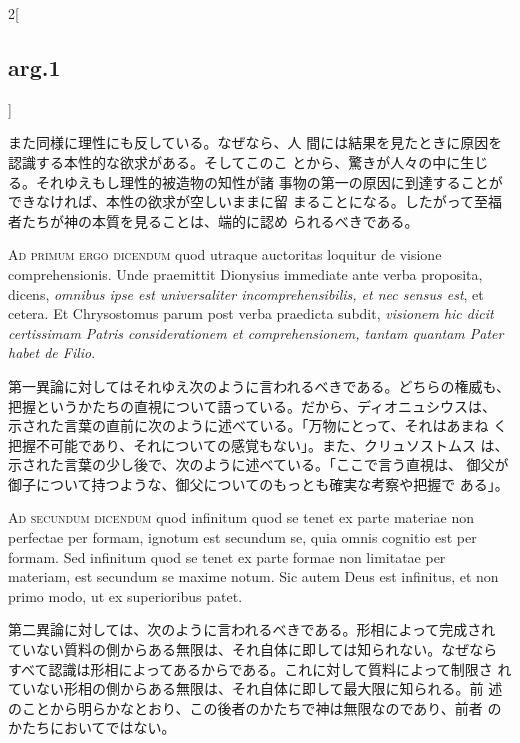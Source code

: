 \documentclass[paper=a4paper,fontsize=10pt,jafontsize=9pt,titlepage]{jlreq}
\begin{document}
\begin{paracol}{2}[\subsection{arg.1}]
\switchcolumn

また同様に理性にも反している。なぜなら、人
間には結果を見たときに原因を認識する本性的な欲求がある。そしてこのこ
とから、驚きが人々の中に生じる。それゆえもし理性的被造物の知性が諸
事物の第一の原因に到達することができなければ、本性の欲求が空しいままに留
まることになる。したがって至福者たちが神の本質を見ることは、端的に認め
られるべきである。

\switchcolumn*[\subsection{ad.1}]

{\scshape  Ad primum ergo dicendum} quod utraque auctoritas loquitur de
 visione comprehensionis. Unde praemittit Dionysius immediate ante verba
 proposita, dicens, {\itshape omnibus ipse est universaliter incomprehensibilis,
 et nec sensus est}, et cetera. Et Chrysostomus parum post verba
 praedicta subdit, {\itshape visionem hic dicit certissimam Patris considerationem
 et comprehensionem, tantam quantam Pater habet de Filio}.

\switchcolumn

第一異論に対してはそれゆえ次のように言われるべきである。どちらの権威も、
把握というかたちの直視について語っている。だから、ディオニュシウスは、
示された言葉の直前に次のように述べている。「万物にとって、それはあまね
く把握不可能であり、それについての感覚もない」。また、クリュソストムス
は、示された言葉の少し後で、次のように述べている。「ここで言う直視は、
御父が御子について持つような、御父についてのもっとも確実な考察や把握で
ある」。

\switchcolumn*[\subsection{ad.2}]

{\scshape  Ad secundum dicendum} quod infinitum quod se tenet ex parte
 materiae non perfectae per formam, ignotum est secundum se, quia omnis
 cognitio est per formam. Sed infinitum quod se tenet ex parte formae
 non limitatae per materiam, est secundum se maxime notum. Sic autem
 Deus est infinitus, et non primo modo, ut ex superioribus patet.

\switchcolumn

第二異論に対しては、次のように言われるべきである。形相によって完成され
ていない質料の側からある無限は、それ自体に即しては知られない。なぜなら
すべて認識は形相によってあるからである。これに対して質料によって制限さ
れていない形相の側からある無限は、それ自体に即して最大限に知られる。前
述のことから明らかなとおり、この後者のかたちで神は無限なのであり、前者
のかたちにおいてではない。


\end{paracol}
\end{document}
